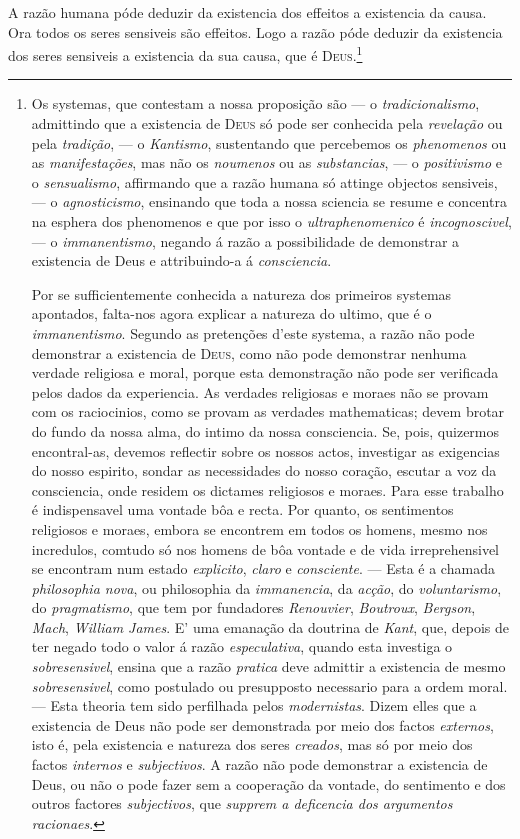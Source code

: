 A razão humana póde deduzir da existencia dos effeitos a existencia da causa. Ora
todos os seres sensiveis são effeitos. Logo a razão póde deduzir da existencia dos
seres sensiveis a existencia da sua causa, que é \textsc{Deus}.\footnote{Os systemas,
que contestam a nossa proposição são --- o \emph{tradicionalismo}, admittindo que a
existencia de \textsc{Deus} só pode ser conhecida pela \emph{revelação} ou pela
\emph{tradição}, --- o \emph{Kantismo}, sustentando que percebemos os
\emph{phenomenos} ou as \emph{manifestações}, mas não os \emph{noumenos} ou as
\emph{substancias}, --- o \emph{positivismo} e o \emph{sensualismo}, affirmando que a
razão humana só attinge objectos sensiveis, --- o \emph{agnosticismo}, ensinando que
toda a nossa sciencia se resume e concentra na esphera dos phenomenos e que por isso o
\emph{ultraphenomenico} é \emph{incognoscivel}, --- o \emph{immanentismo}, negando á
razão a possibilidade de demonstrar a existencia de Deus e attribuindo-a á
\emph{consciencia}.

Por se sufficientemente conhecida a natureza dos primeiros systemas apontados,
falta-nos agora explicar a natureza do ultimo, que é o \emph{immanentismo}. Segundo as
pretenções d'este systema, a razão não pode demonstrar a existencia de \textsc{Deus},
como não pode demonstrar nenhuma verdade religiosa e moral, porque esta demonstração
não pode ser verificada pelos dados da experiencia. As verdades religiosas e moraes não
se provam com os raciocinios, como se provam as verdades mathematicas; devem brotar do
fundo da nossa alma, do intimo da nossa consciencia. Se, pois, quizermos encontral-as,
devemos reflectir sobre os nossos actos, investigar as exigencias do nosso espirito,
sondar as necessidades do nosso coração, escutar a voz da consciencia, onde residem os
dictames religiosos e moraes. Para esse trabalho é indispensavel uma vontade bôa e
recta. Por quanto, os sentimentos religiosos e moraes, embora se encontrem em todos os
homens, mesmo nos incredulos, comtudo só nos homens de bôa vontade e de vida
irreprehensivel se encontram num estado \emph{explicito}, \emph{claro} e
\emph{consciente}. --- Esta é a chamada \emph{philosophia nova}, ou philosophia da
\emph{immanencia}, da \emph{acção}, do \emph{voluntarismo}, do \emph{pragmatismo}, que
tem por fundadores \emph{Renouvier}, \emph{Boutroux}, \emph{Bergson}, \emph{Mach},
\emph{William James}. E' uma emanação da doutrina de \emph{Kant}, que, depois de ter
negado todo o valor á razão \emph{especulativa}, quando esta investiga o
\emph{sobresensivel}, ensina que a razão \emph{pratica} deve admittir a existencia de
mesmo \emph{sobresensivel}, como postulado ou presupposto necessario para a ordem
moral. --- Esta theoria tem sido perfilhada pelos \emph{modernistas}. Dizem elles que a
existencia de Deus não pode ser demonstrada por meio dos factos \emph{externos}, isto
é, pela existencia e natureza dos seres \emph{creados}, mas só por meio dos factos
\emph{internos} e \emph{subjectivos}. A razão não pode demonstrar a existencia de Deus,
ou não o pode fazer sem a cooperação da vontade, do sentimento e dos outros factores
\emph{subjectivos}, que \emph{supprem a deficencia dos argumentos racionaes}.

}
